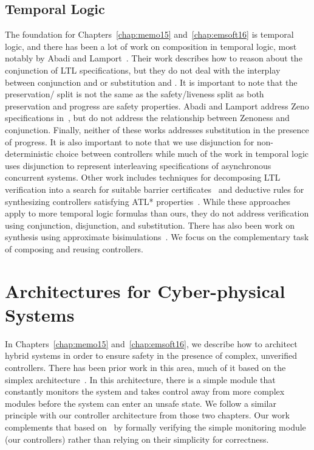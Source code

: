\subsection{Temporal Logic}
The foundation for Chapters~\ref{chap:memo15} and~\ref{chap:emsoft16} is
temporal logic, and there has been a lot of work on composition in temporal
logic, most notably by Abadi and
Lamport~\cite{abadi1995conjoin,abadi1994realtime}.  Their work describes
how to reason about the conjunction of LTL specifications, but they do not
deal with the interplay between conjunction and \progress{} or substitution
and \progress{}.  It is important to note that the preservation/\progress{}
split is not the same as the safety/liveness split as both preservation and
progress are safety properties.  Abadi and Lamport address Zeno
specifications in~\cite{abadi1994realtime}, but do not address the
relationship between Zenoness and conjunction.  Finally, neither of these
works addresses substitution in the presence of progress.  It is also
important to note that we use disjunction for non-deterministic choice
between controllers while much of the work in temporal logic uses
disjunction to represent interleaving specifications of asynchronous
concurrent systems.  Other work includes techniques for decomposing LTL
verification into a search for suitable barrier
certificates~\cite{wongpiromsarntemporal15} and deductive rules for
synthesizing controllers satisfying ATL* properties~\cite{dimitrovaATL14}.
While these approaches apply to more temporal logic formulas than ours,
they do not address verification using conjunction, disjunction, and
substitution.  There has also been work on synthesis using approximate
bisimulations~\cite{tabuada08approx}.  We focus on the complementary task
of composing and reusing controllers.

\section{Architectures for Cyber-physical Systems}
In Chapters~\ref{chap:memo15} and~\ref{chap:emsoft16}, we describe how to
architect hybrid systems in order to ensure safety in the presence of
complex, unverified controllers.  There has been prior work in this area,
much of it based on the simplex architecture~\cite{sha1996evolving}.  In
this architecture, there is a simple module that constantly monitors the
system and takes control away from more complex modules before the system
can enter an unsafe state.  We follow a similar principle with our
controller architecture from those two chapters. Our work complements that
based on~\cite{sha1996evolving} by formally verifying the simple monitoring
module (our controllers) rather than relying on their simplicity for
correctness.

